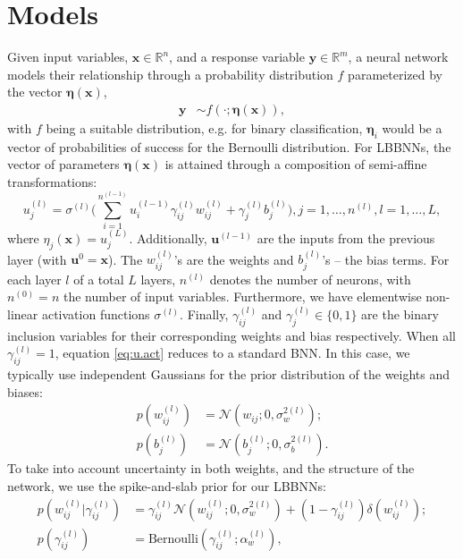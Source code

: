\section{Models}
Given input variables, $\boldsymbol{x} \in \mathbb{R}^n$, and a response variable $\boldsymbol{y} \in \mathbb{R}^m$, a neural network models their relationship through a probability distribution $f$ parameterized by the vector $\boldsymbol{\eta}(\boldsymbol{x})$,
\begin{equation*}
\begin{split}
    \boldsymbol{y} &\sim f(\cdot;\boldsymbol{\eta}(\boldsymbol{x})),
    \end{split}
\end{equation*}
 with $f$ being a suitable distribution, e.g. for binary classification, $\boldsymbol{\eta}_i$ would be a vector of probabilities of success for the Bernoulli distribution.
For LBBNNs, the vector of parameters $\boldsymbol{\eta}(\boldsymbol{x})$ is attained through a composition of semi-affine transformations:
\begin{equation}\label{eq:u.act}
    u_{j}^{(l)} = \sigma^{(l)}\bigg(\sum\limits_{i=1}^{n^{(l-1)}} u_i^{(l-1)}\gamma_{ij}^{(l)}w_{ij}^{(l)} + \gamma_j^{(l)}b_j^{(l)}\bigg), j = 1,\ldots,n^{(l)}, l = 1,\ldots,L,
\end{equation}
{where} $\eta_{j}(\boldsymbol{x}) = u_{j}^{(L)}$. Additionally, $\boldsymbol u^{(l-1)}$ are the inputs from the previous layer (with $\boldsymbol u^0=\boldsymbol x$). The $w_{ij}^{(l)}$'s are the weights and $b_j^{(l)}$'s  -- the bias terms. For each layer $l$ of a total $L$ layers, $n^{(l)}$ denotes the number of neurons,  with $n^{(0)} = n$ the number of input variables. Furthermore, we have elementwise non-linear activation functions $\sigma^{(l)}$.
Finally, $\gamma_{ij}^{(l)}$ and $\gamma_{j}^{(l)}\in\{0,1\}$ are the binary inclusion variables for their corresponding weights and bias respectively. When all $\gamma_{ij}^{(l)} =1$, equation \eqref{eq:u.act} reduces to a standard BNN. In this case, we typically use independent Gaussians for the prior distribution of the weights and biases: 
\begin{align}\label{eq:BNNprior}
    p(w_{ij}^{(l)}) &= \mathcal{N}(w_{ij};0,\sigma_w^{2(l)});\\
    p(b_j^{(l)}) &= \mathcal{N}(b_j^{(l)};0,\sigma_b^{2(l)}).
\end{align}
To take into account uncertainty in both weights, and the structure of the network, we use the spike-and-slab prior for our LBBNNs:
\begin{equation*}
    \begin{split}
    p(w^{(l)}_{ij}|\gamma^{(l)}_{ij}) &= \gamma^{(l)}_{ij}\mathcal{N}(w^{(l)}_{ij};0,\sigma_w^{2(l)})+(1 - \gamma^{(l)}_{ij})\delta(w^{(l)}_{ij}); \\
    p(\gamma^{(l)}_{ij}) &= \text{Bernoulli}(\gamma^{(l)}_{ij};\alpha_w^{(l)}),
    \end{split}
\end{equation*}
